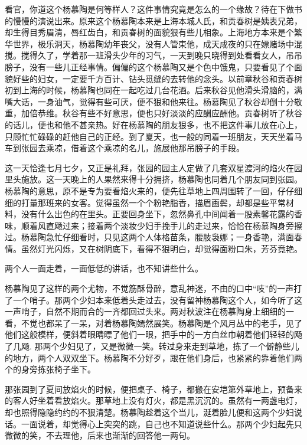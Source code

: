 \documentclass[12pt,UTF8]{ctexbook}
\begin{document}
{{{看官，你道这个杨慕陶是何等样人？这件事情究竟是怎么的一个缘故？待在下做书的慢慢的演说出来。原来这个杨慕陶本来是上海本城人氏，和贡春树是姨表兄弟，却生得目秀眉清，唇红齿白，和贡春树的面貌狠有些儿相象。上海地方本来是个繁华世界，极乐洞天，杨慕陶幼年丧父，没有人管束他，成天成夜的只在嫖赌场中混搅。搅得久了，学着那一班滑头少年的习气，一天到晚只晓得到处看看女人，吊吊膀子，没有一些儿正经事情。偏偏的这个杨慕陶又是个色中饿鬼，只要看见了个面貌好些的妇女，一定要千方百计、钻头觅缝的去转他的念头。以前章秋谷和贡春树初到上海的时候，杨慕陶也同在一起吃过几台花酒。后来秋谷见他滑头滑脑的，满嘴大话，一身油气，觉得有些可厌，便不狠和他来往。杨慕陶见了秋谷却倒十分敬重，加倍恭维。秋谷有些不好意思，便也只好淡淡的应酬应酬他。贡春树听了秋谷的话儿，便也和他不甚亲热。好在杨慕陶的朋友狠多，也不把这件事儿放在心上，只顾忙忙碌碌的赶他自己的正经。到了夏天，也一般的同着一班朋友，天天坐着马车到张园去乘凉，借着这个乘凉的名儿，施展他那吊膀子的手段。

这一天恰逢七月七夕，又正是礼拜，张园的园主人定做了几套双星渡河的焰火在园里头施放。这一天晚上的人果然来得十分拥挤，杨慕陶也同着几个朋友同到张园。杨慕陶的意思，原不是专为要看焰火来的，便先往草地上四周围转了一回，仔仔细细的打量那班来的女客。觉得虽然一个个粉艳脂香，描眉画鬓，却都是些平常材料，没有什么出色的在里头。正要回身坐下，忽然鼻孔中间闻着一股素馨花露的香味，顺着风直飏过来；接着两个淡妆少妇手挽手儿的走过来，恰恰在杨慕陶身旁擦过。杨慕陶急忙仔细看时，只见这两个人体格苗条，腰肢袅娜；一身香艳，满面春情。虽然灯光闪烁，又在树阴底下，看得不狠明白，却觉得面粉口朱，芳芬竟艳。

两个人一面走着，一面低低的讲话，也不知讲些什么。

杨慕陶见了这样的两个尤物，不觉筋酥骨醉，意乱神迷，不由的口中“吱”的一声打了一个哨子。那两个少妇本来低着头走过去，没有留神杨慕陶这个人，如今听了这一声哨子，自然不期而合的一齐都回过头来。两对秋波注在杨慕陶身上细细的一看，不觉也都呆了一呆，对着杨慕陶嫣然展笑。杨慕陶是个风月丛中的老手，见了他们这般模样，便斜着眼睛瞟了他们一眼，把手中的一方白丝巾朝着他们轻轻的飏了几飏. 那两个少妇见了，又是微微一笑。转过身来走到草地，拣了一个僻静些儿的地方，两个人双双坐下。杨慕陶不分好歹，跟在他们身后，也紧紧的靠着他们两个的身旁拣张椅子坐下。

那张园到了夏间放焰火的时候，便把桌子、椅子，都搬在安垲第外草地上，预备来的客人好坐着看放焰火。那草地上没有灯火，都是黑沉沉的。虽然有一两盏电灯，却也照得隐隐约约的不狠清楚。杨慕陶趁着这个当儿，涎着脸儿便和这两个少妇说话。一面说着，却觉得心上突突的跳，自己也不知道说些什么。那两个少妇起先只微微的笑，不去理他，后来也渐渐的回答他一两句。

}}}
\end{document}
